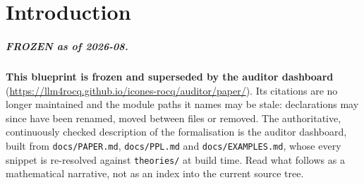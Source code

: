 
%
%

\chapter*{Introduction}

\paragraph{FROZEN as of 2026-08.}
\textbf{This blueprint is frozen and superseded by the auditor
dashboard} (\url{https://llm4rocq.github.io/icones-rocq/auditor/paper/}).
Its citations are no longer maintained and the module paths it names may
be stale: declarations may since have been renamed, moved between files
or removed. The authoritative, continuously checked description of the
formalisation is the auditor dashboard, built from
\texttt{docs/PAPER.md}, \texttt{docs/PPL.md} and
\texttt{docs/EXAMPLES.md}, whose every snippet is re-resolved against
\texttt{theories/} at build time. Read what follows as a mathematical
narrative, not as an index into the current source tree.

